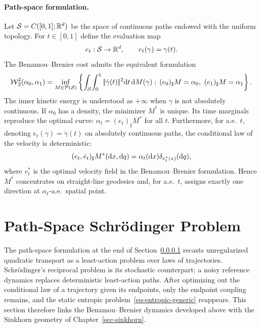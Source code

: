 \paragraph{Path-space formulation.}\label{rem-bb-path-space}
	Let $\mathcal{S}=C([0,1];\mathbb{R}^d)$ be the space of continuous paths endowed with the uniform topology. For $t\in[0,1]$ define the evaluation map
	\[
		e_t:\mathcal{S}\to\mathbb{R}^d,
		\qquad
		e_t(\gamma)=\gamma(t).
	\]
	The Benamou--Brenier cost admits the equivalent formulation
	\[
		\operatorname{\mathcal{W}}_2^2(\alpha_0,\alpha_1)
		=
		\inf_{M\in\mathcal{P}(\mathcal{S})}
		\left\{ 
			\int_{\mathcal{S}}\!\int_0^1|\!| \dot\gamma(t) |\!|^2\mathrm{d} t\,\mathrm{d} M(\gamma)
		 \;;\; 
			(e_0)_\sharp M=\alpha_0,\ (e_1)_\sharp M=\alpha_1
		 \right\}.
	\]
	The inner kinetic energy is understood as $+\infty$ when $\gamma$ is not absolutely continuous. If $\alpha_0$ has a density, the minimizer $M^*$ is unique. Its time marginals reproduce the optimal curve: $\alpha_t=(e_t)_\sharp M^*$ for all $t$. Furthermore, for a.e.\ $t$, denoting $\dot e_t(\gamma)=\dot\gamma(t)$ on absolutely continuous paths, the conditional law of the velocity is deterministic:
	\[
		(e_t,\dot e_t)_\sharp M^*(\mathrm{d} x,\mathrm{d} q)
		=
		\alpha_t(\mathrm{d} x)\delta_{v_t^*(x)}(\mathrm{d} q),
	\]
	where $v_t^*$ is the optimal velocity field in the Benamou--Brenier formulation. Hence $M^*$ concentrates on straight-line geodesics and, for a.e.\ $t$, assigns exactly one direction at $\alpha_t$-a.e.\ spatial point.


\section{Path-Space Schr\"odinger Problem}
\label{sec-path-space-schrodinger}

The path-space formulation at the end of Section~\ref{rem-bb-path-space} recasts unregularized quadratic transport as a least-action problem over laws of trajectories. Schr\"odinger's reciprocal problem is its stochastic counterpart: a noisy reference dynamics replaces deterministic least-action paths. After optimizing out the conditional law of a trajectory given its endpoints, only the endpoint coupling remains, and the static entropic problem~\eqref{eq-entropic-generic} reappears. This section therefore links the Benamou--Brenier dynamics developed above with the Sinkhorn geometry of Chapter~\ref{sec-sinkhorn}.

